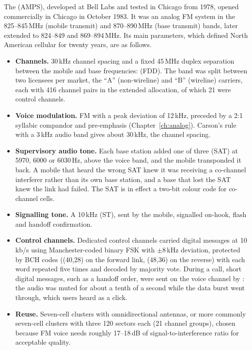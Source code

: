 The  (AMPS), developed at Bell Labs and tested in Chicago from
1978, opened commercially in Chicago in October 1983. It was an analog FM system in the
825--845\,MHz (mobile transmit) and 870--890\,MHz (base transmit) bands, later extended to 824--849
and 869--894\,MHz. Its main parameters, which defined North American cellular for twenty years, are
as follows.
\begin{itemize}
\item \textbf{Channels.} 30\,kHz channel spacing and a fixed 45\,MHz duplex separation between the
mobile and base frequencies:  (FDD). The band was split between two
licensees per market, the ``A'' (non-wireline) and ``B'' (wireline) carriers, each with 416 channel
pairs in the extended allocation, of which 21 were control channels.
\item \textbf{Voice modulation.} FM with a peak deviation of 12\,kHz, preceded by a 2:1 syllabic
compandor and pre-emphasis (Chapter~\ref{ch:analog}). Carson's rule with a 3\,kHz audio band gives
about 30\,kHz, the channel spacing.
\item \textbf{Supervisory audio tone.} Each base station added one of three
 (SAT) at 5970, 6000 or 6030\,Hz, above the voice band, and the mobile
transponded it back. A mobile that heard the wrong SAT knew it was receiving a co-channel interferer
rather than its own base station, and a base that lost the SAT knew the link had failed. The SAT is
in effect a two-bit colour code for co-channel cells.
\item \textbf{Signalling tone.} A 10\,kHz  (ST), sent by the mobile, signalled
on-hook, flash and handoff confirmation.

\item \textbf{Control channels.} Dedicated control channels carried digital messages at 10\,kb/s
using Manchester-coded binary FSK with $\pm8$\,kHz deviation, protected by BCH codes ((40,28) on the
forward link, (48,36) on the reverse) with each word repeated five times and decoded by majority
vote. During a call, short digital messages, such as a handoff order, were sent on the voice channel
by : the audio was muted for about a tenth of a second while the data burst
went through, which users heard as a click.
\item \textbf{Reuse.} Seven-cell clusters with omnidirectional antennas, or more commonly seven-cell
clusters with three 120\textdegree{} sectors each (21 channel groups), chosen because FM voice needs
roughly 17--18\,dB of signal-to-interference ratio for acceptable quality.
\end{itemize}


